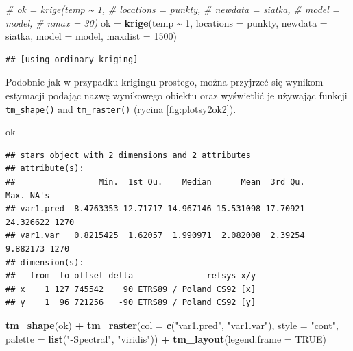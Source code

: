 \documentclass[
  paper=6in:9in,pagesize=pdftex,headinclude=on,footinclude=on,10pt]{scrbook}
\newenvironment{Shaded}{\begin{snugshade}}{\end{snugshade}}
\newcommand{\AttributeTok}[1]{\textcolor[rgb]{0.13,0.29,0.53}{#1}}
\newcommand{\CommentTok}[1]{\textcolor[rgb]{0.56,0.35,0.01}{\textit{#1}}}
\newcommand{\ConstantTok}[1]{\textcolor[rgb]{0.56,0.35,0.01}{#1}}
\newcommand{\DecValTok}[1]{\textcolor[rgb]{0.00,0.00,0.81}{#1}}
\newcommand{\FunctionTok}[1]{\textcolor[rgb]{0.13,0.29,0.53}{\textbf{#1}}}
\newcommand{\NormalTok}[1]{#1}
\newcommand{\OtherTok}[1]{\textcolor[rgb]{0.56,0.35,0.01}{#1}}
\newcommand{\SpecialCharTok}[1]{\textcolor[rgb]{0.81,0.36,0.00}{\textbf{#1}}}
\newcommand{\StringTok}[1]{\textcolor[rgb]{0.31,0.60,0.02}{#1}}
\begin{document}
\begin{Shaded}
\begin{Highlighting}[]
\CommentTok{\# ok = krige(temp \textasciitilde{} 1,}
\CommentTok{\#             locations = punkty,}
\CommentTok{\#             newdata = siatka, }
\CommentTok{\#             model = model, }
\CommentTok{\#             nmax = 30)}
\NormalTok{ok }\OtherTok{=} \FunctionTok{krige}\NormalTok{(temp }\SpecialCharTok{\textasciitilde{}} \DecValTok{1}\NormalTok{,}
            \AttributeTok{locations =}\NormalTok{ punkty,}
            \AttributeTok{newdata =}\NormalTok{ siatka, }
            \AttributeTok{model =}\NormalTok{ model, }
            \AttributeTok{maxdist =} \DecValTok{1500}\NormalTok{)}
\end{Highlighting}
\end{Shaded}

\begin{verbatim}
## [using ordinary kriging]
\end{verbatim}

Podobnie jak w przypadku krigingu prostego, można przyjrzeć się wynikom estymacji podając nazwę wynikowego obiektu oraz wyświetlić je używając funkcji \texttt{tm\_shape()} and \texttt{tm\_raster()} (rycina \ref{fig:plotsy2ok2}).

\begin{Shaded}
\begin{Highlighting}[]
\NormalTok{ok}
\end{Highlighting}
\end{Shaded}

\begin{verbatim}
## stars object with 2 dimensions and 2 attributes
## attribute(s):
##                 Min.  1st Qu.    Median      Mean  3rd Qu.      Max. NA's
## var1.pred  8.4763353 12.71717 14.967146 15.531098 17.70921 24.326622 1270
## var1.var   0.8215425  1.62057  1.990971  2.082008  2.39254  9.882173 1270
## dimension(s):
##   from  to offset delta               refsys x/y
## x    1 127 745542    90 ETRS89 / Poland CS92 [x]
## y    1  96 721256   -90 ETRS89 / Poland CS92 [y]
\end{verbatim}

\begin{Shaded}
\begin{Highlighting}[]
\FunctionTok{tm\_shape}\NormalTok{(ok) }\SpecialCharTok{+}
        \FunctionTok{tm\_raster}\NormalTok{(}\AttributeTok{col =} \FunctionTok{c}\NormalTok{(}\StringTok{"var1.pred"}\NormalTok{, }\StringTok{"var1.var"}\NormalTok{),}
                  \AttributeTok{style =} \StringTok{"cont"}\NormalTok{, }
                  \AttributeTok{palette =} \FunctionTok{list}\NormalTok{(}\StringTok{"{-}Spectral"}\NormalTok{, }\StringTok{"viridis"}\NormalTok{)) }\SpecialCharTok{+}
        \FunctionTok{tm\_layout}\NormalTok{(}\AttributeTok{legend.frame =} \ConstantTok{TRUE}\NormalTok{)}
\end{Highlighting}
\end{Shaded}
\end{document}
